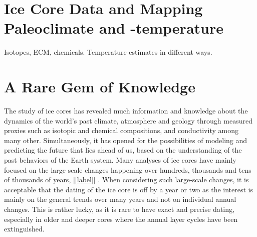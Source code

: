 \documentclass[../../CompleteThesis2/Complete_2ndDraft]{subfiles}
\begin{document}
	
	\section[Ice Core Data]{Ice Core Data and Mapping Paleoclimate and -temperature}
	
	Isotopes, ECM, chemicals. Temperature estimates in different ways.
	
	\section[A Rare Gem]{A Rare Gem of Knowledge}
	
	The study of ice cores has revealed much information and knowledge about the dynamics of the world's past climate, atmosphere and geology through measured proxies such as isotopic and chemical compositions, and conductivity among many other. Simultaneously, it has opened for the possibilities of modeling and predicting the future that lies ahead of us, based on the understanding of the past behaviors of the Earth system. Many analyses of ice cores have mainly focused on the large scale changes happening over hundreds, thousands and tens of thousands of years, [\ref{label}] .	When considering such large-scale changes, it is acceptable that the dating of the ice core is off by a year or two as the interest is mainly on the general trends over many years and not on individual annual changes. This is rather lucky, as it is rare to have exact and precise dating, especially in older and deeper cores where the annual layer cycles have been extinguished. 
\end{document}

